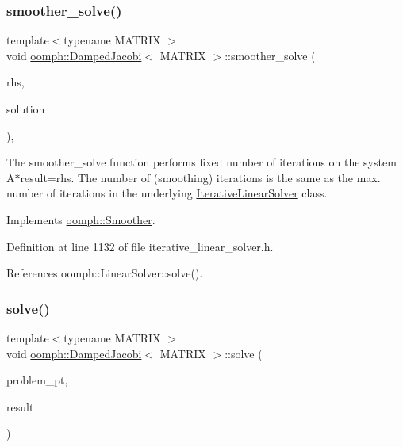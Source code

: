 \subsubsection{\texorpdfstring{smoother\+\_\+solve()}{smoother\_solve()}}
{\footnotesize\ttfamily template$<$typename M\+A\+T\+R\+IX $>$ \\
void \hyperlink{classoomph_1_1DampedJacobi}{oomph\+::\+Damped\+Jacobi}$<$ M\+A\+T\+R\+IX $>$\+::smoother\+\_\+solve (\begin{DoxyParamCaption}\item[{const \hyperlink{classoomph_1_1DoubleVector}{Double\+Vector} \&}]{rhs,  }\item[{\hyperlink{classoomph_1_1DoubleVector}{Double\+Vector} \&}]{solution }\end{DoxyParamCaption})\hspace{0.3cm}{\ttfamily [inline]}, {\ttfamily [virtual]}}



The smoother\+\_\+solve function performs fixed number of iterations on the system A$\ast$result=rhs. The number of (smoothing) iterations is the same as the max. number of iterations in the underlying \hyperlink{classoomph_1_1IterativeLinearSolver}{Iterative\+Linear\+Solver} class. 



Implements \hyperlink{classoomph_1_1Smoother_a94899c8d7bf84c068cda8d312d195bfe}{oomph\+::\+Smoother}.



Definition at line 1132 of file iterative\+\_\+linear\+\_\+solver.\+h.



References oomph\+::\+Linear\+Solver\+::solve().

\mbox{\label{classoomph_1_1DampedJacobi_ace422835d94b7d465d08cc1f4df192ea}} 
\subsubsection{\texorpdfstring{solve()}{solve()}\hspace{0.1cm}{\footnotesize\ttfamily [1/2]}}
{\footnotesize\ttfamily template$<$typename M\+A\+T\+R\+IX $>$ \\
void \hyperlink{classoomph_1_1DampedJacobi}{oomph\+::\+Damped\+Jacobi}$<$ M\+A\+T\+R\+IX $>$\+::solve (\begin{DoxyParamCaption}\item[{\hyperlink{classoomph_1_1Problem}{Problem} $\ast$const \&}]{problem\+\_\+pt,  }\item[{\hyperlink{classoomph_1_1DoubleVector}{Double\+Vector} \&}]{result }\end{DoxyParamCaption})\hspace{0.3cm}{\ttfamily [virtual]}}



